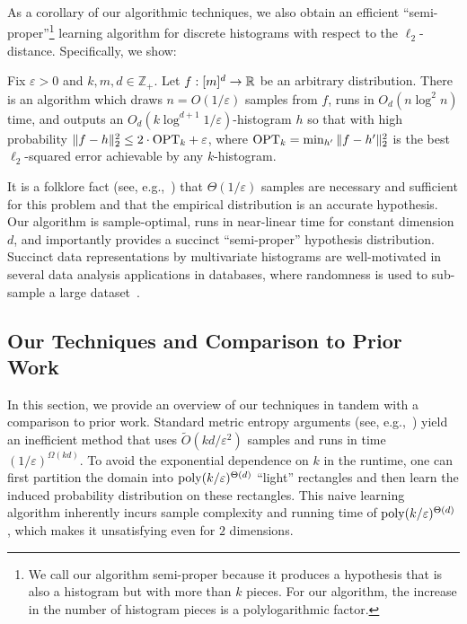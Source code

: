 \documentclass[final,12pt]{colt2018} %
\newcommand{\eps}{\varepsilon}
\newcommand{\new}[1]{{\color{red} #1}}
\newcommand{\new}[1]{{#1}}
\begin{document}

\new{As a corollary of our algorithmic techniques, we also obtain an efficient ``semi-proper''\footnote{We call our algorithm semi-proper because it produces a hypothesis that is also a histogram but with more than $k$ pieces. For our algorithm, the increase in the number of histogram pieces is a polylogarithmic factor.} learning algorithm for 
discrete histograms with respect to the $\ell_2$-distance. Specifically, we show:}
\begin{theorem}
\label{thm:l2-informal}
Fix $\eps > 0$ and $k, m, d \in \mathbb{Z}_+$.
Let $f: [m]^d \to \operatorname{\mathbb{R}}$ be an arbitrary distribution.
There is an algorithm which draws $n = O(1 / \eps)$ samples from $f$, runs in $O_d(n \log^2 n)$ time,
and outputs an $O_d(k \log^{d + 1} 1 / \eps)$-histogram $h$ so that with high probability
$\| f - h \|_2^2 \leq 2 \cdot \OPT_k + \eps$,
where $\mathrm{OPT}_k = \min_{h'} \| f - h' \|_2^2$ is the best $\ell_2$-squared error achievable by any $k$-histogram.
\end{theorem}

\new{
It is a folklore fact (see, e.g.,~\cite{ADHLS15}) that $\Theta(1/\eps)$ samples are necessary 
and sufficient for this problem and that the empirical distribution is an accurate hypothesis. 
Our algorithm is sample-optimal, runs in near-linear time for constant dimension $d$, and importantly 
provides a succinct ``semi-proper'' hypothesis distribution. 
Succinct data representations by multivariate histograms are well-motivated in several data analysis 
applications in databases, where randomness is used to sub-sample a large dataset~\cite{CGHJ12}.}


\subsection{Our Techniques and Comparison to Prior Work}

\new{
In this section, we provide an overview of our techniques in tandem with a comparison to prior work.
Standard metric entropy arguments (see, e.g.,~\cite{DL:01})
yield an inefficient method that uses $\tilde{O}(kd/\eps^2)$ samples and runs in time $(1/\eps)^{\Omega(kd)}$.
To avoid the exponential dependence on $k$ in the runtime, one can first partition the domain into
$\poly(k/\eps)^{\Theta(d)}$ ``light'' rectangles and then learn the induced probability distribution on these
rectangles. This naive learning algorithm inherently incurs sample complexity and running time 
of $\poly(k/\eps)^{\Theta(d)}$, which makes it unsatisfying even for $2$ dimensions.
}
\end{document}
